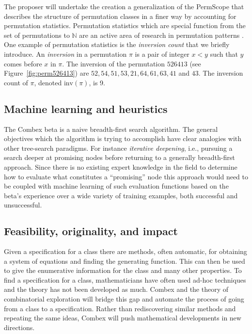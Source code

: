 \documentclass{rannis}
\newcommand{\motheralg}{\textsf{Combex}}
\newcommand{\tilealg}{\textsf{PermScope}}
\theoremstyle{definition}
\begin{document}
The proposer will undertake the creation
a generalization of the \tilealg{} that describes the structure of permutation
classes in a finer way by accounting for permutation statistics.
Permutation statistics which are special function from the set of
permutations to $\mathbb{N}$
are an active area of research in permutation patterns
\cite{bukata2019statisitics,dokos2012statistics,
babson2000vincular,branden2011meshpattern}.
One example of permutation statistics is the \emph{inversion count} that we
briefly introduce.
An \emph{inversion} in a permutation $\pi$ is a pair of integer $x < y$ such that $y$
comes before $x$ in $\pi$. The inversion of the permutation $526413$
(see Figure~\ref{fig:perm526413}) are $52, 54,51,53,21,64,61,63,41$ and $43$.
The inversion count of $\pi$, denoted $\mathrm{inv}(\pi)$, is 9.


\subsection*{Machine learning and heuristics}
The \motheralg{} beta is a naive breadth-first search algorithm. The
general objectives which the algorithm is trying to accomplish have clear
analogies with other tree-search paradigms. For instance
\emph{iterative deepening}, i.e., pursuing a search deeper at promising nodes
before returning to a generally breadth-first approach. Since there is no
existing expert knowledge in the field to determine how to evaluate what
constitutes a ``promising'' node this approach would need to be coupled with
machine learning of such evaluation functions based on the beta's
experience over a wide variety of training examples, both successful and
unsuccessful.

\subsection*{Feasibility, originality, and impact}
Given a
specification for a class there are methods, often automatic, for
obtaining a system of equations and finding the generating function.
This can then be used to give the enumerative information for
the class and many other properties. To find a
specification for a class, mathematicians have often
used ad-hoc techniques and the theory has not been developed as much.
\motheralg{} and the theory of combinatorial exploration will bridge this gap
and automate the process of going from a class to a
specification. Rather than rediscovering similar methods and repeating the same
ideas, \motheralg{} will push mathematical developments in new directions.
\end{document}
